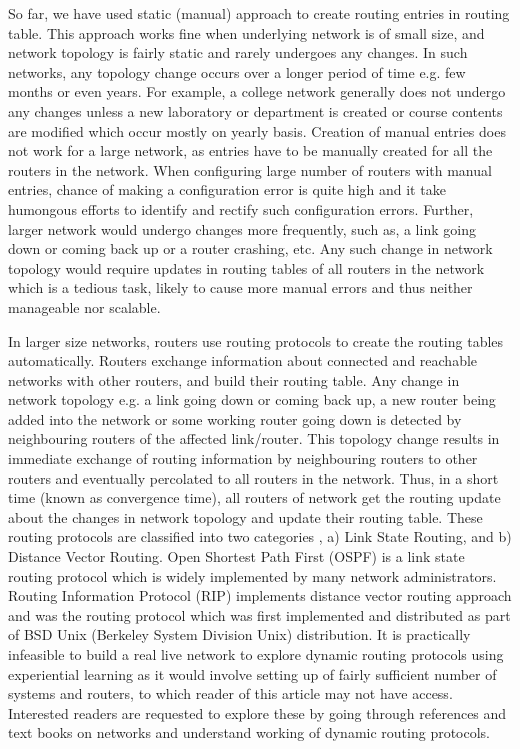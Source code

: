 \begin{multicols}{2}
So far, we have used static (manual) approach to create routing entries in routing table. This approach works fine when underlying network is of small size, and network topology is fairly static and rarely undergoes any changes. In such networks, any topology change occurs over a longer period of time e.g. few months or even years. For example, a college network generally does not undergo any changes unless a new laboratory or department is created or course contents are modified which occur mostly on yearly basis. Creation of manual entries does not work for a large network, as entries have to be manually created for all the routers in the network.  When configuring large number of routers with manual entries, chance of making a configuration error is quite high and it take humongous efforts to identify and rectify such configuration errors. Further, larger network would undergo changes more frequently, such as, a link going down or coming back up or a router crashing, etc.  Any such change in network topology would require updates in routing tables of all routers in the network which is a tedious task, likely to cause more manual errors and thus neither manageable nor scalable.


In larger size networks, routers use routing protocols to create the routing tables automatically. Routers exchange information about connected and reachable networks with other routers, and build their routing table. Any change in network topology e.g. a link going down or coming back up, a new router being added into the network or some working router going down is detected by neighbouring routers of the affected link/router. This topology change results in immediate exchange of routing information by neighbouring routers to other routers and eventually percolated to all routers in the network. Thus, in a short time (known as convergence time), all routers of network get the routing update about the changes in network topology and update their routing table. These routing protocols are classified into two categories  \cite{art2-key10}, a) Link State Routing, and b) Distance Vector Routing. Open Shortest Path First (OSPF)\cite{art2-key04} is a link state routing protocol which is widely implemented by many network administrators. Routing Information Protocol (RIP) \cite{art2-key05}\cite{art2-key06} implements distance vector routing approach and was the routing protocol which was first implemented and distributed as part of BSD Unix (Berkeley System Division Unix) distribution. It is practically infeasible to build a real live network to explore dynamic routing protocols using experiential learning as it would involve setting up of fairly sufficient number of systems and routers, to which reader of this article may not have access. Interested readers are requested to explore these by going through references and text books on networks and understand working of dynamic routing protocols.


\end{multicols}
